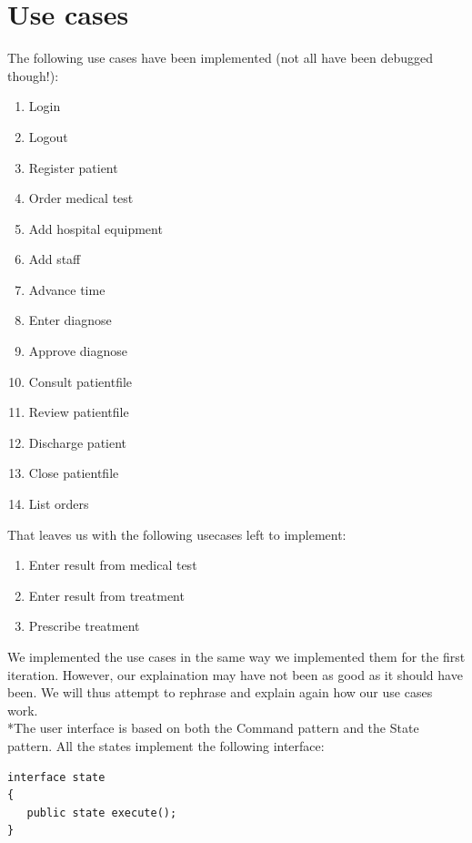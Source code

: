 \documentclass[11pt]{article}
\begin{document}
\section{Use cases}
The following use cases have been implemented (not all have been debugged though!):
\begin{enumerate}
\item{Login}
\item{Logout}
\item{Register patient}
\item{Order medical test}
\item{Add hospital equipment}
\item{Add staff}
\item{Advance time}
\item{Enter diagnose}
\item{Approve diagnose}
\item{Consult patientfile}
\item{Review patientfile}
\item{Discharge patient}
\item{Close patientfile}
\item{List orders}
\end{enumerate}
That leaves us with the following usecases left to implement:
\begin{enumerate}
\item{Enter result from medical test}
\item{Enter result from treatment}
\item{Prescribe treatment}
\end{enumerate}
We implemented the use cases in the same way we implemented them for the first iteration. However, our explaination may have not been as good as it should have been. We will thus attempt to rephrase and explain again how our use cases work.
\\*The user interface is based on both the Command pattern and the State pattern. All the states implement the following interface:
\begin{lstlisting}
interface state
{
   public state execute();
}
\end{lstlisting}
\end{document}
